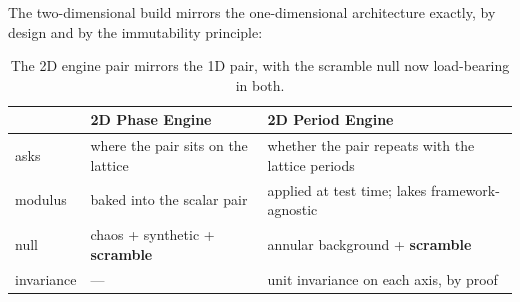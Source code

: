 \documentclass[11pt, letterpaper, openany]{book}
\begin{document}
The two-dimensional build mirrors the one-dimensional architecture exactly, by design and by the
immutability principle:

\begin{table}[H]
\centering
\small
\begin{tabular}{@{}lll@{}}
\toprule
& \textbf{2D Phase Engine} & \textbf{2D Period Engine} \\
\midrule
asks & where the pair sits on the lattice & whether the pair repeats with the lattice periods \\
modulus & baked into the scalar pair & applied at test time; lakes framework-agnostic \\
null & chaos + synthetic + \textbf{scramble} & annular background + \textbf{scramble} \\
invariance & --- & unit invariance on each axis, by proof \\
\bottomrule
\end{tabular}
\caption{The 2D engine pair mirrors the 1D pair, with the scramble null now load-bearing in both.}
\end{table}
\end{document}
